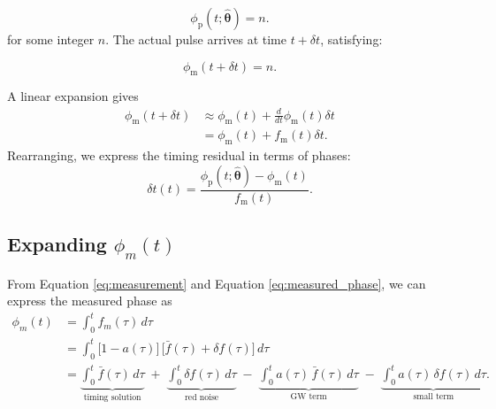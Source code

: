 \documentclass[]{scrartcl}
\begin{document}
\begin{equation}
	\phi_{\text{p}}(t; \boldsymbol{\hat{\theta}}) = n.
	\end{equation}
for some integer $n$. The actual pulse arrives at time $t + \delta t$, satisfying:

\begin{equation}
	\phi_{\text{m}}(t + \delta t) = n.
\end{equation}

\noindent A linear expansion gives
\begin{align}
	\phi_{\text{m}}(t + \delta t)  &\approx \phi_{\text{m}}(t) + \frac{d}{dt} \phi_{\text{m}}(t) \delta t \nonumber \\
	&= \phi_{\text{m}}(t) + f_{\text{m}}(t) \delta t. \label{eq:assumption 1}
\end{align}
Rearranging, we express the timing residual in terms of phases:
\begin{equation}
	\delta t (t)= \frac{\phi_{\text{p}}(t; \boldsymbol{\hat{\theta}}) - \phi_{\text{m}}(t)}{f_{\text{m}}(t)}. \label{eq:delta_t}
\end{equation}


\subsection{Expanding $\phi_m(t)$}
From Equation \eqref{eq:measurement} and Equation \eqref{eq:measured_phase}, we can express the measured phase as
\begin{align}
	\phi_m(t)
	&= \int_{0}^{t} f_m(\tau)\,d\tau \\
	&= \int_{0}^{t} 
	\bigl[1 - a(\tau)\bigr]\,
	\bigl[\bar{f}(\tau) + \delta f(\tau)\bigr]\,d\tau \\
	&= \underbrace{\int_{0}^{t} \bar{f}(\tau)\,d\tau}_{\text{timing solution}}
	\;+\;
	\underbrace{\int_{0}^{t} \delta f(\tau)\,d\tau}_{\text{red noise}}
	\;-\;
	\underbrace{\int_{0}^{t} a(\tau)\,\bar{f}(\tau)\,d\tau}_{\text{GW term}}
	\;-\;
	\underbrace{\int_{0}^{t} a(\tau)\,\delta f(\tau)\,d\tau}_{\text{small term}}. \label{eq:phi_m_decomposed}
\end{align}
\end{document}
